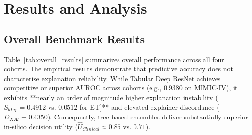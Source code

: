 \documentclass[3p,times,procedia]{elsarticle}
\theoremstyle{definition}
\begin{document}
\section{Results and Analysis}

\subsection{Overall Benchmark Results}

Table~\ref{tab:overall_results} summarizes overall performance across all four cohorts. The empirical results demonstrate that predictive accuracy does not characterize explanation reliability. While Tabular Deep ResNet achieves competitive or superior AUROC across cohorts (e.g., 0.9380 on MIMIC-IV), it exhibits **nearly an order of magnitude higher explanation instability ($S_{bLip} = 0.4912$ vs. $0.0512$ for ET)** and elevated explainer discordance ($D_{XAI} = 0.4350$). Consequently, tree-based ensembles deliver substantially superior in-silico decision utility ($\widehat{U}_{Clinical} \approx 0.85$ vs. $0.71$).
\end{document}
